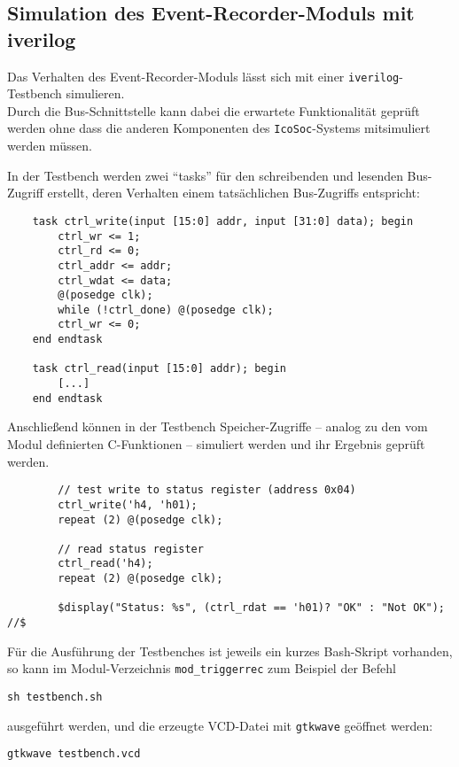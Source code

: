 {\subsection{Simulation des Event-Recorder-Moduls mit iverilog}

Das Verhalten des Event-Recorder-Moduls lässt sich mit einer {\tt iverilog}-Testbench simulieren.\\
Durch die Bus-Schnittstelle kann dabei die erwartete Funktionalität geprüft werden ohne dass die anderen Komponenten des {\tt IcoSoc}-Systems mitsimuliert werden  müssen.

In der Testbench werden zwei ``tasks'' für den schreibenden und lesenden Bus-Zugriff erstellt, deren Verhalten einem tatsächlichen Bus-Zugriffs entspricht:

\begin{verbatim}
	task ctrl_write(input [15:0] addr, input [31:0] data); begin
		ctrl_wr <= 1;
		ctrl_rd <= 0;
		ctrl_addr <= addr;
		ctrl_wdat <= data;
		@(posedge clk);
		while (!ctrl_done) @(posedge clk);
		ctrl_wr <= 0;
	end endtask

	task ctrl_read(input [15:0] addr); begin
		[...]
	end endtask
\end{verbatim}

Anschließend können in der Testbench Speicher-Zugriffe -- analog zu den vom Modul definierten C-Funktionen -- simuliert werden und ihr Ergebnis geprüft werden.
\begin{verbatim}
		// test write to status register (address 0x04)
		ctrl_write('h4, 'h01); 
		repeat (2) @(posedge clk);
		
		// read status register
		ctrl_read('h4);	
		repeat (2) @(posedge clk);
		
		$display("Status: %s", (ctrl_rdat == 'h01)? "OK" : "Not OK");                                                    //$	

\end{verbatim}

Für die Ausführung der Testbenches ist jeweils ein kurzes Bash-Skript vorhanden, so kann im Modul-Verzeichnis {\tt mod\_triggerrec} zum Beispiel der Befehl
\begin{verbatim}
sh testbench.sh
\end{verbatim}
ausgeführt werden, und die erzeugte VCD-Datei mit {\tt gtkwave} geöffnet werden:
\begin{verbatim}
gtkwave testbench.vcd
\end{verbatim}

}
